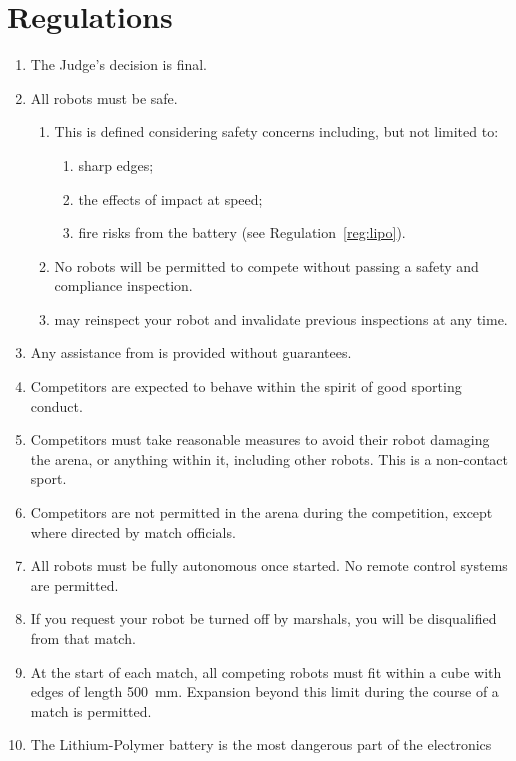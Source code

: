 \section{Regulations}
\label{sec:regs}

\begin{enumerate}
\item The Judge's decision is final.
\item All robots must be safe.
  \begin{enumerate}
    \item This is defined considering safety concerns including, but not limited
          to:
      \begin{enumerate}
        \item sharp edges;
        \item the effects of impact at speed;
        \item fire risks from the battery (see Regulation~\ref{reg:lipo}).
      \end{enumerate}
    \item No robots will be permitted to compete without passing a safety and
          compliance inspection.
    \item \staff may reinspect your robot and invalidate previous inspections at
          any time.
  \end{enumerate}
\item Any assistance from \staff is provided without guarantees.
\item Competitors are expected to behave within the spirit of good
      sporting conduct.
\item Competitors must take reasonable measures to avoid their robot damaging
      the arena, or anything within it, including other robots. This is a
      non-contact sport.
\item Competitors are not permitted in the arena during the competition,
      except where directed by match officials.
\item All robots must be fully autonomous once started. No remote control
      systems are permitted.
\item If you request your robot be turned off by marshals, you will be
      disqualified from that match.
\item At the start of each match, all competing robots must fit within a cube
      with edges of length \SI{500}{mm}. Expansion beyond this limit during the
      course of a match is permitted.
\item \label{reg:lipo}
      The Lithium-Polymer battery is the most dangerous part of the electronics

\end{enumerate}
